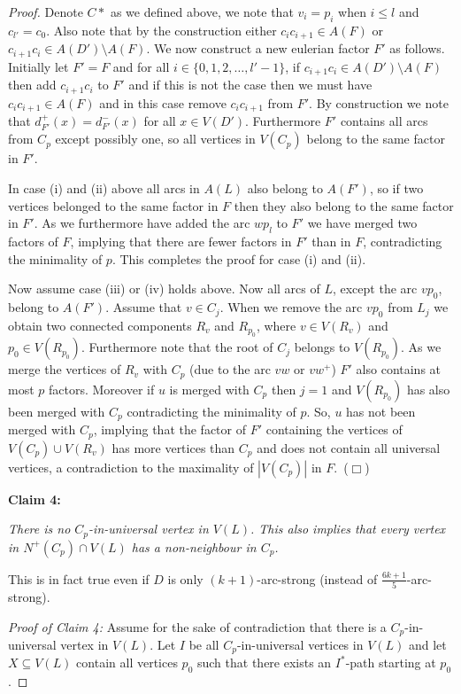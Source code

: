 \documentclass{article}
\newcommand{\smallqed}{\hfill {\tiny ($\Box$)}}
\newcommand{\2}{\vspace{2mm}}
\theoremstyle{plain}
\theoremstyle{definition}
\begin{document}
\begin{proof}
Denote $C*$ as we defined above, we note that $v_i=p_i$ when $i \leq l$ and $c_{l'}=c_0$. Also note that
by the construction either $c_i c_{i+1} \in A(F)$ or $c_{i+1} c_i \in A(D') \setminus A(F)$. We now construct a new eulerian 
factor $F'$ as follows. Initially let $F'=F$ and for all $i \in \{0,1,2,\ldots,l'-1\}$,
if $c_{i+1} c_i \in A(D') \setminus A(F)$ then add $c_{i+1} c_i$ to $F'$ and if this is not the case then we must have
$c_i c_{i+1} \in A(F)$ and in this case remove $c_ic_{i+1}$ from $F'$.
By construction we note that $d_{F'}^+(x) = d_{F'}^-(x)$ for all $x \in V(D')$. Furthermore $F'$ contains all arcs
from $C_p$ except possibly one, so all vertices in $V(C_p)$ belong to the same factor in $F'$. 

In case (i) and (ii) 
above all arcs in $A(L)$ also belong to $A(F')$, so if two vertices belonged to the same factor in $F$ then they also
belong to the same factor in $F'$. As we furthermore have added the arc $wp_l$ to $F'$ we have merged two factors of $F$, implying
that there are fewer factors in $F'$ than in $F$, contradicting the minimality of $p$.  This completes the proof for case
(i) and (ii).

Now assume case (iii) or (iv) holds above. Now all arcs of $L$, except the arc $v p_0$, belong to $A(F')$. Assume
that $v \in C_j$. When we remove the arc $v p_0$ from $L_{j}$ we obtain two connected components $R_v$ and $R_{p_0}$,
where $v \in V(R_v)$ and $p_0 \in V(R_{p_0})$. Furthermore note that the root of $C_j$ belongs to $V(R_{p_0})$.
As we merge the vertices of $R_v$ with $C_p$ (due to the arc $v w$ or $v w^+$) $F'$ also contains at most $p$ factors.
Moreover if $u$ is merged with $C_p$ then $j=1$ and $V(R_{p_0})$ has also been merged with $C_p$ contradicting the minimality of $p$.
So, $u$ has not been merged with $C_p$, implying that the factor of $F'$ containing the vertices of $V(C_p) \cup V(R_v)$ has
more vertices than $C_p$ and does not contain all universal vertices, a contradiction to the maximality of $|V(C_p)|$ in $F$.~\smallqed{}



\2

{\bf Claim 4:} {\em There is no $C_p$-in-universal vertex in $V(L)$.
This also implies that every vertex in $N^+(C_p) \cap V(L)$ has a non-neighbour in $C_p$.

This is in fact true even if $D$ is only $(k+1)$-arc-strong (instead of $\frac{6k+1}{5}$-arc-strong).}

\2

{\em Proof of Claim 4:} Assume for the sake of contradiction that there is a 
$C_p$-in-universal vertex in $V(L)$. Let $I$ be all $C_p$-in-universal vertices in $V(L)$ and
let $X \subseteq V(L)$ contain all vertices $p_0$ such that there exists an $I^*$-path starting at $p_0$.


\end{proof}
\end{document}

